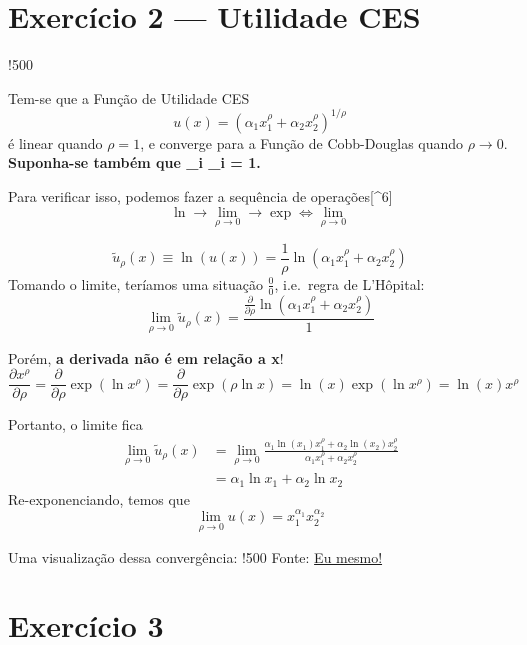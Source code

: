 \documentclass[12pt]{article}
\title{}
\author{}
\date{}
\numberwithin{equation}{section}
\theoremstyle{plain}
\theoremstyle{definition}
\theoremstyle{remark}
\begin{document}
\maketitle

\hypertarget{exercuxedcio-2-utilidade-ces}{%
\section{Exercício 2 --- Utilidade
CES}\label{exercuxedcio-2-utilidade-ces}}

!500

Tem-se que a Função de Utilidade CES \[
u(x) = (\alpha_{1} x_{1}^\rho + \alpha_{2}x_{2}^\rho)^{1/\rho}
\] é linear quando \(\rho = 1\), e converge para a Função de
Cobb-Douglas quando \(\rho \to 0\).
\textbf{Suponha-se também que \sum_{i} \alpha_{i} = 1.}

Para verificar isso, podemos fazer a sequência de operações{[}\^{}6{]}
\[
\ln \to \lim_{ \rho \to 0 } \to \exp \iff \lim_{ \rho \to 0 } 
\]

\[
\tilde{u}_{\rho}(x) \equiv \ln(u(x)) = \frac{1}{\rho} \ln(\alpha_{1} x_{1}^\rho + \alpha_{2}x_{2}^\rho)
\] Tomando o limite, teríamos uma situação \(\frac{0}{0}\), i.e.~regra
de L'Hôpital: \[
\lim_{ \rho \to 0 } \tilde{u}_{\rho}(x) = \frac{\frac{ \partial  }{ \partial \rho } \ln(\alpha_{1} x_{1}^\rho + \alpha_{2}x_{2}^\rho)}{1}
\]

Porém, \textbf{a derivada não é em relação a x}! \[
\frac{ \partial x^\rho }{ \partial \rho } = \frac{ \partial  }{ \partial \rho } \exp(\ln x^\rho) = \frac{ \partial  }{ \partial \rho } \exp(\rho \ln x) = \ln(x) \exp(\ln x^\rho) = \ln(x) x^\rho
\]

Portanto, o limite fica \[
\begin{align*}
\lim_{ \rho \to 0 } \tilde{u}_{\rho}(x) &= \lim_{ \rho \to 0 } \frac{\alpha_{1} \ln(x_{1}) x_{1}^\rho + \alpha_{2} \ln(x_{2}) x_{2}^\rho}{\alpha_{1} x_{1}^\rho + \alpha_{2} x_{2}^\rho} \\
&= \alpha_{1} \ln x_{1} + \alpha_{2} \ln x_{2}
\end{align*}
\] Re-exponenciando, temos que \[
\lim_{ \rho \to 0 } u(x) = x_{1}^{\alpha_{1}} x_{2}^{\alpha_{2}}
\]

Uma visualização dessa convergência: !500 Fonte:
\href{https://github.com/nicholasvoltani/Manimations/tree/master/ConstantElasticitySubstitution_Function}{Eu
mesmo!}

\hypertarget{exercuxedcio-3}{%
\section{Exercício 3}\label{exercuxedcio-3}}
\end{document}
